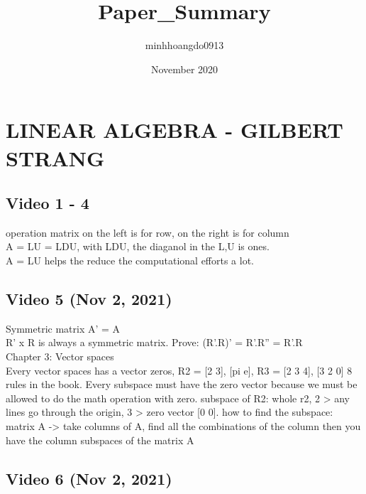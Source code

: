 \documentclass{article}
\title{Paper_Summary}
\author{minhhoangdo0913 }
\date{November 2020}
\begin{document}
\tableofcontents

\clearpage
\newpage
{}
    


\section{LINEAR ALGEBRA - GILBERT STRANG}
\subsection{Video 1 - 4}

operation matrix on the left is for row, on the right is for column \cite{RN10}
\\A = LU = LDU, with LDU, the diaganol in the L,U is ones.
\\A = LU helps the reduce the computational efforts a lot.


\subsection{Video 5 (Nov 2, 2021)}

Symmetric matrix A' = A
\\R' x R is always a symmetric matrix. Prove: (R'.R)' = R'.R'' = R'.R
\\Chapter 3: Vector spaces
\\Every vector spaces has a vector zeros, R2 = [2 3], [pi e], R3 = [2 3 4], [3 2 0]
8 rules in the book.
Every subspace must have the zero vector because we must be allowed to do the math operation with zero.
subspace of R2: whole r2, 2 > any lines go through the origin, 3 > zero vector [0 0].
how to find the subspace: matrix A -> take columns of A, find all the combinations of the column then you have the column subspaces of the matrix A

\subsection{Video 6 (Nov 2, 2021) }
\end{document}

